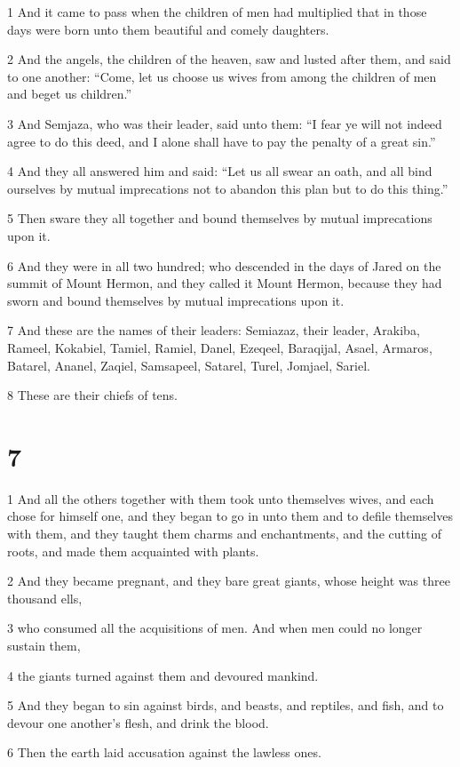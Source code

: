 \par 1 And it came to pass when the children of men had multiplied that in those days were born unto them beautiful and comely daughters.
\par 2 And the angels, the children of the heaven, saw and lusted after them, and said to one another: “Come, let us choose us wives from among the children of men and beget us children.”
\par 3 And Semjaza, who was their leader, said unto them: “I fear ye will not indeed agree to do this deed, and I alone shall have to pay the penalty of a great sin.”
\par 4 And they all answered him and said: “Let us all swear an oath, and all bind ourselves by mutual imprecations not to abandon this plan but to do this thing.”
\par 5 Then sware they all together and bound themselves by mutual imprecations upon it.
\par 6 And they were in all two hundred; who descended in the days of Jared on the summit of Mount Hermon, and they called it Mount Hermon, because they had sworn and bound themselves by mutual imprecations upon it.
\par 7 And these are the names of their leaders: Semiazaz, their leader, Arakiba, Rameel, Kokabiel, Tamiel, Ramiel, Danel, Ezeqeel, Baraqijal, Asael, Armaros, Batarel, Ananel, Zaqiel, Samsapeel, Satarel, Turel, Jomjael, Sariel. 
\par 8 These are their chiefs of tens.

\chapter{7}

\par 1 And all the others together with them took unto themselves wives, and each chose for himself one, and they began to go in unto them and to defile themselves with them, and they taught them charms and enchantments, and the cutting of roots, and made them acquainted with plants.
\par 2 And they became pregnant, and they bare great giants, whose height was three thousand ells, 
\par 3 who consumed all the acquisitions of men. And when men could no longer sustain them,
\par 4 the giants turned against them and devoured mankind.
\par 5 And they began to sin against birds, and beasts, and reptiles, and fish, and to devour one another's flesh, and drink the blood.
\par 6 Then the earth laid accusation against the lawless ones.


